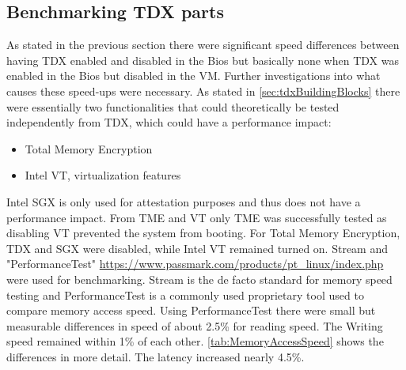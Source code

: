 \subsection{Benchmarking TDX parts}

As stated in the previous section there were significant speed differences between having TDX enabled and disabled in the Bios but basically none when TDX was enabled in the Bios but disabled in the VM. Further investigations into what causes these speed-ups were necessary. As stated in \ref{sec:tdxBuildingBlocks} there were essentially two functionalities that could theoretically be tested independently from TDX, which could have a performance impact:
\begin{itemize}
    \item Total Memory Encryption 
    \item Intel VT, virtualization features
\end{itemize}
Intel \Gls{SGX} is only used for attestation purposes and thus does not have a performance impact. From TME and VT only TME was successfully tested as disabling VT prevented the system from booting.
For Total Memory Encryption, TDX and \Gls{SGX} were disabled, while Intel VT remained turned on. Stream \cite{mccalpin_memory_1995} and "PerformanceTest" \url{https://www.passmark.com/products/pt_linux/index.php} were used for benchmarking. Stream is the de facto standard for memory speed testing and PerformanceTest is a commonly used proprietary tool used to compare memory access speed. Using PerformanceTest there were small but measurable differences in speed of about 2.5\% for reading speed. The Writing speed remained within 1\% of each other. \cref{tab:MemoryAccessSpeed} shows the differences in more detail. The latency increased nearly 4.5\%.
\begin{table}
\centering
{}
\caption{Results of Performancetests memory benchmark}
\label{tab:MemoryAccessSpeed}
\end{table}

